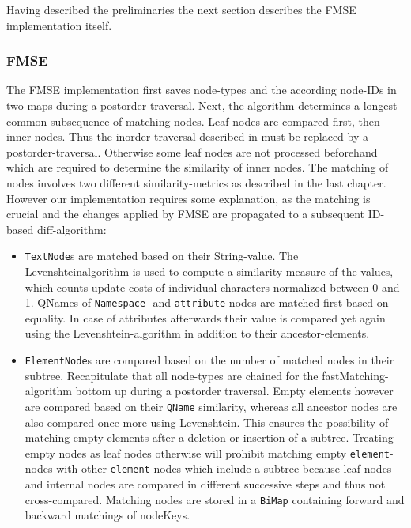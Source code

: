 Having described the preliminaries the next section describes the FMSE implementation itself.

\subsubsection{FMSE} The FMSE implementation first saves node-types and the according node-IDs in two maps during a postorder traversal. Next, the algorithm determines a longest common subsequence of matching nodes. Leaf nodes are compared first, then inner nodes. Thus the inorder-traversal described in \cite{chawathe1996change} must be replaced by a postorder-traversal. Otherwise some leaf nodes are not processed beforehand which are required to determine the similarity of inner nodes. The matching of nodes involves two different similarity-metrics as described in the last chapter. However our implementation requires some explanation, as the matching is crucial and the changes applied by FMSE are propagated to a subsequent ID-based diff-algorithm:

\begin{itemize}
\item \texttt{TextNode}s are matched based on their String-value. The Levenshtein\-algo\-rithm is used to compute a similarity measure of the values, which counts update costs of individual characters normalized between 0 and 1. QNames of \texttt{Namespace}- and \texttt{attribute}-nodes are matched first based on equality. In case of attributes afterwards their value is compared yet again using the Levenshtein-algorithm in addition to their ancestor-elements.

\item \texttt{ElementNode}s are compared based on the number of matched nodes in their subtree. Recapitulate that all node-types are chained for the fast\-Matching-algorithm bottom up during a postorder traversal. Empty elements however are compared based on their \texttt{QName} similarity, whereas all ancestor nodes are also compared once more using Levenshtein. This ensures the possibility of matching empty-elements after a deletion or insertion of a subtree. Treating empty nodes as leaf nodes otherwise will prohibit matching empty \texttt{element}-nodes with other \texttt{element}-nodes which include a subtree because leaf nodes and internal nodes are compared in different successive steps and thus not cross-compared. Matching nodes are stored in a \texttt{BiMap} containing forward and backward matchings of nodeKeys.
\end{itemize}

